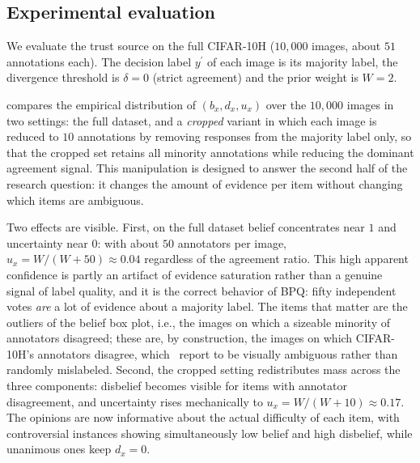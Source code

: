 \subsection{Experimental evaluation}
\label{sec:dataset-trust:applications:cifar10h:eval}

We evaluate the trust source on the full CIFAR-10H ($10{,}000$ images, about $51$ annotations each). The decision label $y^\prime$ of each image is its majority label, the divergence threshold is $\delta = 0$ (strict agreement) and the prior weight is $W = 2$.

 compares the empirical distribution of $(b_x, d_x, u_x)$ over the $10{,}000$ images in two settings: the full dataset, and a \emph{cropped} variant in which each image is reduced to $10$ annotations by removing responses from the majority label only, so that the cropped set retains all minority annotations while reducing the dominant agreement signal. This manipulation is designed to answer the second half of the research question: it changes the amount of evidence per item without changing which items are ambiguous.

Two effects are visible. First, on the full dataset belief concentrates near $1$ and uncertainty near $0$: with about $50$ annotators per image, $u_x = W / (W + 50) \approx 0.04$ regardless of the agreement ratio. This high apparent confidence is partly an artifact of evidence saturation rather than a genuine signal of label quality, and it is the correct behavior of \ac{BPQ}: fifty independent votes \emph{are} a lot of evidence about a majority label. The items that matter are the outliers of the belief box plot, i.e., the images on which a sizeable minority of annotators disagreed; these are, by construction, the images on which CIFAR-10H's annotators disagree, which~\cite{peterson2019human} report to be visually ambiguous rather than randomly mislabeled. Second, the cropped setting redistributes mass across the three components: disbelief becomes visible for items with annotator disagreement, and uncertainty rises mechanically to $u_x = W / (W + 10) \approx 0.17$. The opinions are now informative about the actual difficulty of each item, with controversial instances showing simultaneously low belief and high disbelief, while unanimous ones keep $d_x = 0$.

